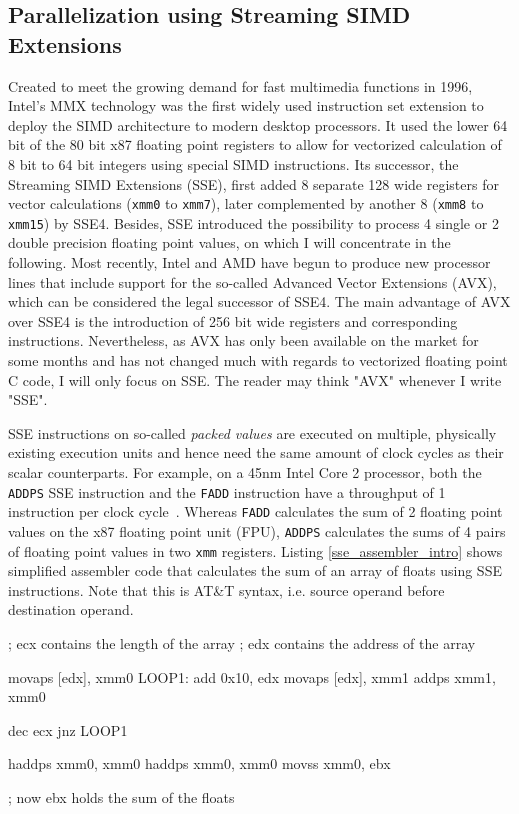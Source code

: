 \subsection{Parallelization using Streaming SIMD Extensions}
Created to meet the growing demand for fast multimedia functions in 1996, Intel's MMX technology was the first widely used instruction set extension to deploy the SIMD architecture to modern desktop processors. It used the lower 64 bit of the 80 bit x87 floating point registers to allow for vectorized calculation of 8 bit to 64 bit integers using special SIMD instructions. Its successor, the Streaming SIMD Extensions (SSE), first added 8 separate 128 wide registers for vector calculations (\texttt{xmm0} to \texttt{xmm7}), later complemented by another 8 (\texttt{xmm8} to \texttt{xmm15}) by SSE4. Besides, SSE introduced the possibility to process 4 single or 2 double precision floating point values, on which I will concentrate in the following. Most recently, Intel and AMD have begun to produce new processor lines that include support for the so-called Advanced Vector Extensions (AVX), which can be considered the legal successor of SSE4. The main advantage of AVX over SSE4 is the introduction of 256 bit wide registers and corresponding instructions. Nevertheless, as AVX has only been available on the market for some months and has not changed much with regards to vectorized floating point C code, I will only focus on SSE. The reader may think "AVX" whenever I write "SSE".

SSE instructions on so-called \emph{packed values} are executed on multiple, physically existing execution units and hence need the same amount of clock cycles as their scalar counterparts. For example, on a 45nm Intel Core 2 processor, both the \texttt{ADDPS} SSE instruction and the \texttt{FADD} instruction have a throughput of 1 instruction per clock cycle~\cite[pp. 50, 57]{fog2011instructiontables}. Whereas \texttt{FADD} calculates the sum of 2 floating point values on the x87 floating point unit (FPU), \texttt{ADDPS} calculates the sums of 4 pairs of floating point values in two \texttt{xmm} registers. Listing \ref{sse_assembler_intro} shows simplified assembler code that calculates the sum of an array of floats using SSE instructions. Note that this is AT\&T syntax, i.e. source operand before destination operand.
\begin{assembler}[caption={Array sum using simplified SSE assembly}, label=sse_assembler_intro]
  ; ecx contains the length of the array
  ; edx contains the address of the array

  movaps [edx], xmm0
LOOP1:
  add    0x10, edx
  movaps [edx], xmm1
  addps  xmm1, xmm0

  dec    ecx
  jnz    LOOP1

  haddps xmm0, xmm0
  haddps xmm0, xmm0
  movss  xmm0, ebx

  ; now ebx holds the sum of the floats
\end{assembler}

